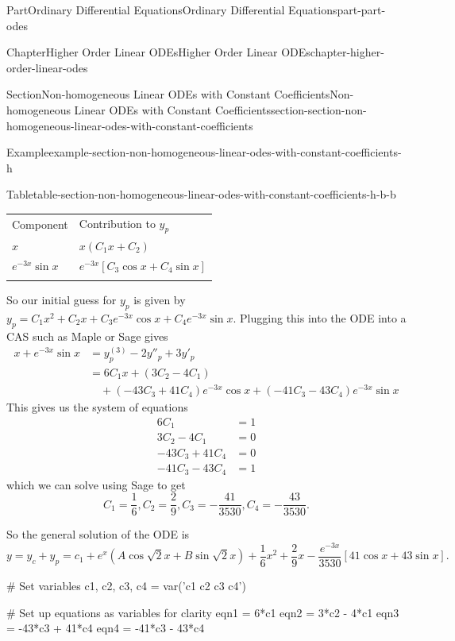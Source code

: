 \documentclass[twoside,10pt,]{book}
\numberwithin{equation}{part}
\newcommand{\hrulethick} {\noalign{\hrule height 0.11em}}
\newcommand{\brackets}[1]{\left[ #1 \right]}
\newcommand{\parens}[1]{\left( #1 \right)}
\newcommand{\amp}{&}
\begin{document}
\begin{partptx}{Part}{Ordinary Differential Equations}{}{Ordinary Differential Equations}{}{}{part-part-odes}
\begin{chapterptx}{Chapter}{Higher Order Linear ODEs}{}{Higher Order Linear ODEs}{}{}{chapter-higher-order-linear-odes}
\begin{sectionptx}{Section}{Non-homogeneous Linear ODEs with Constant Coefficients}{}{Non-homogeneous Linear ODEs with Constant Coefficients}{}{}{section-section-non-homogeneous-linear-odes-with-constant-coefficients}
\begin{example}{Example}{}{example-section-non-homogeneous-linear-odes-with-constant-coefficients-h}
\begin{tableptx}{Table}{\textbf{}}{table-section-non-homogeneous-linear-odes-with-constant-coefficients-h-b-b}{}
{\begin{tabular}{ll}
Component&Contribution to \(y_{p}\)\tabularnewline\hrulethick
\(x\)&\(x(C_{1}x+C_{2})\)\tabularnewline[0pt]
\(e^{-3x}\sin x\)&\(e^{-3x}\brackets{C_{3}\cos x+C_{4}\sin x}\)\tabularnewline\hrulethick
\end{tabular}
}%
\end{tableptx}%
So our initial guess for \(y_{p}\) is given by \(y_{p} = C_{1}x^{2}+C_{2}x+C_{3}e^{-3x}\cos x+C_{4}e^{-3x}\sin x\). Plugging this into the ODE into a CAS such as Maple or Sage gives%
\begin{align*}
x+e^{-3x}\sin x \amp= y^{(3)}_{p}-2y''_{p}+3y'_{p}\\
\amp= 6C_{1}x+(3C_{2}-4C_{1}) \\
\amp\quad + \parens{-43C_{3}+41C_{4}}e^{-3x}\cos x+\parens{-41C_{3}-43C_{4}}e^{-3x}\sin x
\end{align*}
This gives us the system of equations%
\begin{align*}
6C_{1}  \amp=  1\\
3C_{2}-4C_{1} \amp=  0\\
-43C_{3}+41C_{4}  \amp=  0\\
-41C_{3}-43C_{4}  \amp= 1
\end{align*}
which we can solve using Sage to get%
\begin{equation*}
C_{1} = \frac{1}{6},C_{2} = \frac{2}{9},C_{3} = -\frac{41}{3530},C_{4}=-\frac{43}{3530}.
\end{equation*}
%
\par
So the general solution of the ODE is%
\begin{equation*}
y = y_{c}+y_{p} = c_{1}+e^{x}(A\cos\sqrt{2}x+B\sin\sqrt{2}x) +\frac{1}{6}x^{2}+\frac{2}{9}x-\frac{e^{-3x}}{3530}\brackets{41\cos x+43\sin x}.
\end{equation*}
%
\end{example}
\begin{sageinput}
# Set variables
c1, c2, c3, c4 = var('c1 c2 c3 c4')

# Set up equations as variables for clarity
eqn1 = 6*c1
eqn2 = 3*c2 - 4*c1
eqn3 = -43*c3 + 41*c4
eqn4 = -41*c3 - 43*c4


\end{sageinput}
\end{sectionptx}
\end{chapterptx}
\end{partptx}
\end{document}
